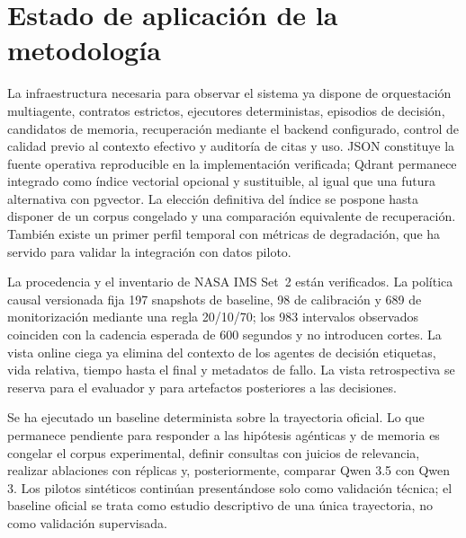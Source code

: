 \section{Estado de aplicación de la metodología}

La infraestructura necesaria para observar el sistema ya dispone de
orquestación multiagente, contratos estrictos, ejecutores deterministas,
episodios de decisión, candidatos de memoria, recuperación mediante el backend
configurado, control de calidad previo al contexto efectivo y auditoría de citas
y uso. JSON constituye la fuente operativa reproducible en la implementación verificada;
Qdrant permanece integrado como índice vectorial opcional y sustituible, al
igual que una futura alternativa con pgvector. La elección definitiva del
índice se pospone hasta disponer de un corpus congelado y una comparación
equivalente de recuperación. También existe un primer perfil temporal con métricas de degradación,
que ha servido para validar la integración con datos piloto.

La procedencia y el inventario de NASA IMS Set~2 están verificados. La política
causal versionada fija 197 snapshots de baseline, 98 de calibración y 689 de
monitorización mediante una regla 20/10/70; los 983 intervalos observados
coinciden con la cadencia esperada de 600 segundos y no introducen cortes. La
vista online ciega ya elimina del contexto de los agentes de decisión etiquetas,
vida relativa, tiempo hasta el final y metadatos de fallo. La vista
retrospectiva se reserva para el evaluador y para artefactos posteriores a las
decisiones.

Se ha ejecutado un baseline determinista sobre la trayectoria oficial. Lo que
permanece pendiente para responder a las hipótesis agénticas y de memoria es
congelar el corpus experimental, definir consultas con juicios de relevancia,
realizar ablaciones con réplicas y, posteriormente, comparar Qwen 3.5 con
Qwen 3. Los pilotos sintéticos continúan presentándose solo como validación
técnica; el baseline oficial se trata como estudio descriptivo de una única
trayectoria, no como validación supervisada.
